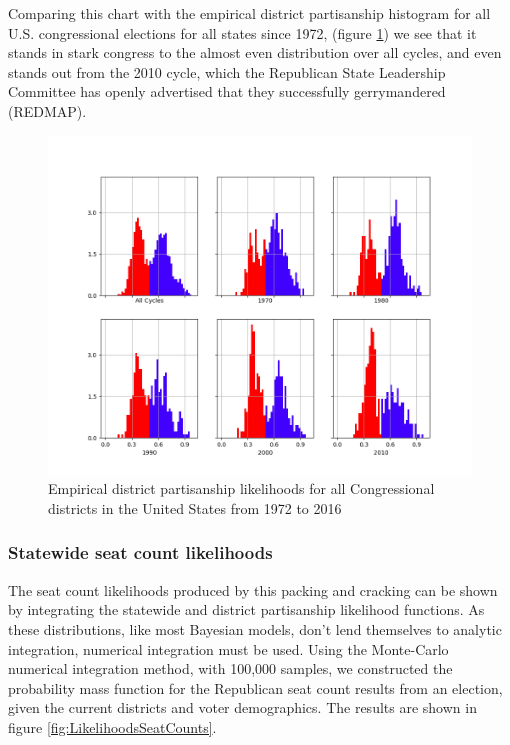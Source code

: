 \documentclass[preprint,12pt]{article}
\begin{document}
Comparing this chart with the empirical district partisanship histogram for all U.S. congressional elections for all states since 1972, (figure \ref{fig:LikelihoodsDistrictPartisanshipAll}) we see that it stands in stark congress to the almost even distribution over all cycles, and even stands out from the 2010 cycle, which the Republican State Leadership Committee has openly advertised that they successfully gerrymandered (REDMAP).

\begin{figure}[htb!]
    \begin{center}
        \includegraphics[scale=0.4]{../Figures/WI2010/cycle_partisan_likelihoods.png}
        \caption{Empirical district partisanship likelihoods for all Congressional districts in the United States from 1972 to 2016}\label{fig:LikelihoodsDistrictPartisanshipAll}
    \end{center}
\end{figure}
 
\subsubsection{Statewide seat count likelihoods}
 
The seat count likelihoods produced by this packing and cracking can be shown by integrating the statewide and district partisanship likelihood functions.  As these distributions, like most Bayesian models, don't lend themselves to analytic integration, numerical integration must be used. Using the Monte-Carlo numerical integration method, with 100,000 samples, we constructed the probability mass function for the Republican seat count results from an election, given the current districts and voter demographics.  The results are shown in figure \ref{fig:LikelihoodsSeatCounts}.
 
\end{document}
